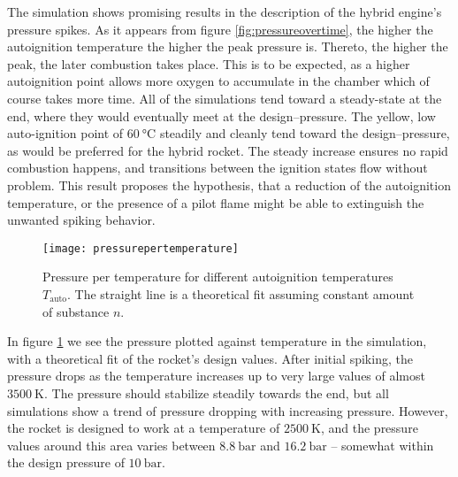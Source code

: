   The simulation shows promising results in the description of the hybrid engine's pressure spikes. As it appears from figure \ref{fig:pressureovertime}, the higher the autoignition temperature the higher the peak pressure is. Thereto, the higher the peak, the later combustion takes place. This is to be expected, as a higher autoignition point allows more oxygen to accumulate in the chamber which of course takes more time. All of the simulations tend toward a steady-state at the end, where they would eventually meet at the design--pressure. The yellow, low auto-ignition point of $\SI{60}{\celsius}$ steadily and cleanly tend toward the design--pressure, as would be preferred for the hybrid rocket. The steady increase ensures no rapid combustion happens, and transitions between the ignition states flow without problem. This result proposes the hypothesis, that a reduction of the autoignition temperature, or the presence of a pilot flame might be able to extinguish the unwanted spiking behavior.

  \begin{figure}
  	\centering
  	\texttt{[image: pressurepertemperature]}
  	\caption{Pressure per temperature for different autoignition temperatures $T_\text{auto}$. The straight line is a theoretical fit assuming constant amount of substance $n$.}
  	\label{fig:pressurepertemperature}
  \end{figure}

  In figure \ref{fig:pressurepertemperature} we see the pressure plotted against temperature in the simulation, with a theoretical fit of the rocket's design values. After initial spiking, the pressure drops as the temperature increases up to very large values of almost $\SI{3500}{\kelvin}$. The pressure should stabilize steadily towards the end, but all simulations show a trend of pressure dropping with increasing pressure. However, the rocket is designed to work at a temperature of $\SI{2500}{\kelvin}$, and the pressure values around this area varies between $\SI{8.8}{\bar}$ and $\SI{16.2}{\bar}$ -- somewhat within the design pressure of $\SI{10}{\bar}$.

